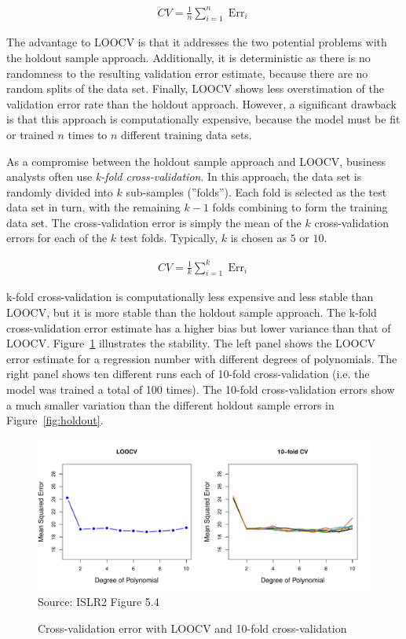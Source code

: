 \begin{align*}
CV = \frac{1}{n} \sum\nolimits_{i=1}^n \operatorname{Err}_i
\end{align*}

The advantage to LOOCV is that it addresses the two potential problems with the holdout sample approach. Additionally, it is deterministic as there is no randomness to the resulting validation error estimate, because there are no random splits of the data set. Finally, LOOCV shows less overstimation of the validation error rate than the holdout approach. However, a significant drawback is that this approach is computationally expensive, because the model must be fit or trained $n$ times to $n$ different training data sets. 

As a compromise between the holdout sample approach and LOOCV, business analysts often use \emph{k-fold cross-validation}. In this approach, the data set is randomly divided into $k$ sub-samples (''folds''). Each fold is selected as the test data set in turn, with the remaining $k-1$ folds combining to form the training data set. The cross-validation error is simply the mean of the $k$ cross-validation errors for each of the $k$ test folds. Typically, $k$ is chosen as $5$ or $10$.

\begin{align*}
CV = \frac{1}{k} \sum\nolimits_{i=1}^k \operatorname{Err}_i
\end{align*}

k-fold cross-validation is computationally less expensive and less stable than LOOCV, but it is more stable than the holdout sample approach. The k-fold cross-validation error estimate has a higher bias but lower variance than that of LOOCV. Figure~\ref{fig:kfold} illustrates the stability. The left panel shows the LOOCV error estimate for a regression number with different degrees of polynomials. The right panel shows ten different runs each of 10-fold cross-validation (i.e. the model was trained a total of 100 times). The 10-fold cross-validation errors show a much smaller variation than the different holdout sample errors in Figure~\ref{fig:holdout}.

\begin{figure}
\centering

\includegraphics[width=\textwidth]{Figures_Chapters_1-6/Chapter5/5_4.pdf}
\scriptsize Source: ISLR2 Figure 5.4
\caption{Cross-validation error with LOOCV and 10-fold cross-validation}
\label{fig:kfold}
\end{figure}

